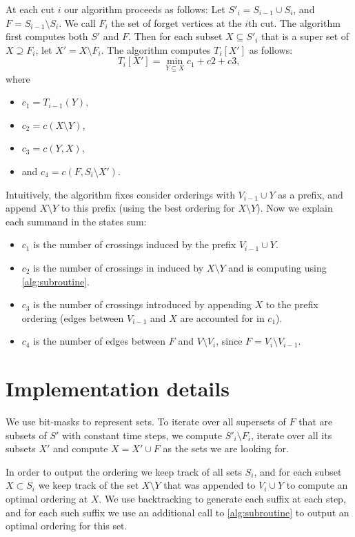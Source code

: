 \documentclass[a4paper,UKenglish,cleveref, autoref, thm-restate]{lipics-v2021}
\begin{document}
At each cut $i$ our algorithm proceeds as follows: 
Let $S'_i = S_{i-1} \cup S_i$, and $F = S_{i-1} \setminus S_{i}$. We call $F_i$ the set of forget vertices at the $i$th cut. The algorithm first computes both $S'$ and $F$. Then for each subset $X \subseteq S'_i$ that is a super set of $X \supseteq F_i$, let $X' = X\setminus F_i$. The algorithm computes $T_{i}[X']$ as follows:
\begin{equation} \label{eq:t-rec}
    T_i[X'] = \min\limits_{Y\subseteq X} c_1 + c2 + c3,
\end{equation}
where
\begin{itemize}
    \item $c_1 = T_{i-1}(Y)$,
    \item $c_2 = c(X\setminus Y)$,
    \item $c_3 = c(Y, X)$,
    \item and $c_4 = c(F, S_i \setminus X')$.
\end{itemize}
Intuitively, the algorithm fixes consider orderings with $V_{i-1} \cup Y$ as a prefix, and append $X \setminus Y$ to this prefix (using the best ordering for $X\setminus Y$). Now we explain each summand in the states sum:
\begin{itemize}
    \item $c_1$ is the number of crossings induced by the prefix $V_{i-1}\cup Y$.
    \item $c_2$ is the number of crossings in induced by $X\setminus Y$ and is computing using \cref{alg:subroutine}.
    \item $c_3$ is the number of crossings introduced by appending $X$ to the prefix ordering (edges between $V_{i-1}$ and $X$ are accounted for in $c_1$).
    \item $c_4$ is the number of edges between $F$ and $V\setminus V_{i}$, since $F = V_i \setminus V_{i-1}$.
\end{itemize}

\section{Implementation details}
We use bit-masks to represent sets. To iterate over all supersets of $F$ that are subsets of $S'$ with constant time steps, we compute $S'_i\setminus F_i$, iterate over all its subsets $X'$ and compute $X = X' \cup F$ as the sets we are looking for.

In order to output the ordering we keep track of all sets $S_i$, and for each subset $X\subset S_i$ we keep track of the set $X\setminus Y$ that was appended to $V_i \cup Y$ to compute an optimal ordering at $X$. We use backtracking to generate each suffix at each step, and for each such suffix we use an additional call to \cref{alg:subroutine} to output an optimal ordering for this set.
\end{document}
